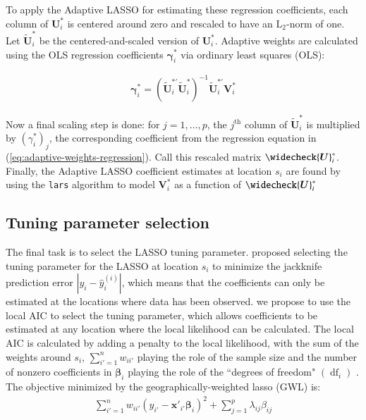 \documentclass[authoryear, review, 11pt]{elsarticle}
\DeclareMathOperator*{\df}{\mbox{df}}
\begin{document}
	To apply the Adaptive LASSO for estimating these regression coefficients, each column of $\bm{U}_i^*$ is centered around zero and rescaled to have an $\mbox{L}_2$-norm of one. Let $\widetilde{\bm{U}}_i^*$ be the centered-and-scaled version of $\bm{U}_i^*$. Adaptive weights are calculated using the OLS regression coefficients $\bm{\gamma}_i^*$ via ordinary least squares (OLS):
	
	\begin{eqnarray}\label{eq:adaptive-weights-regression}
		\bm{\gamma}_i^* = \left( \widetilde{\bm{U}}_i^{*'} \widetilde{\bm{U}}_i^* \right)^{-1} \widetilde{\bm{U}}_i^{*'} \bm{V}_i^*
	\end{eqnarray}
	
	Now a final scaling step is done: for $j=1, \dots, p$, the $j^{\mbox{th}}$ column of $\tilde{\bm{U}}_i^*$ is multiplied by $\left(\gamma_i^*\right)_j$, the corresponding coefficient from the regression equation in (\ref{eq:adaptive-weights-regression}). Call this rescaled matrix $\widecheck{\bm{U}}_i^*$.\\
	
	Finally, the Adaptive LASSO coefficient estimates at location $s_i$ are found by using the \verb!lars! algorithm to model $\bm{V}_i^*$ as a function of $\widecheck{\bm{U}}_i^*$

	\subsection{Tuning parameter selection}
	The final task is to select the LASSO tuning parameter. \cite{Wheeler:2009} proposed selecting the tuning parameter for the LASSO at location $s_i$ to minimize the jackknife prediction error $|y_i - \hat{y}_i^{(i)}|$, which means that the coefficients can only be estimated at the locations where data has been observed. we propose to use the local AIC to select the tuning parameter, which allows coefficients to be estimated at any location where the local likelihood can be calculated. The local AIC is calculated by adding a penalty to the local likelihood, with the sum of the weights around $s_i$, $\sum_{i'=1}^n w_{ii'}$ playing the role of the sample size and the number of nonzero coefficients in $\bm{\beta}_i$ playing the role of the ``degrees of freedom" $\left( \df_i \right)$ \citep{Zou:2007}.\\
	
	The objective minimized by the geographically-weighted lasso (GWL) is:	
	\begin{eqnarray}
		\sum_{i'=1}^n w_{ii'} \left(y_{i'} - \bm{x}'_{i'} \bm{\beta}_i \right)^2 + \sum_{j=1}^p \lambda_{ij} \beta_{ij}
	\end{eqnarray}
	
\end{document}
